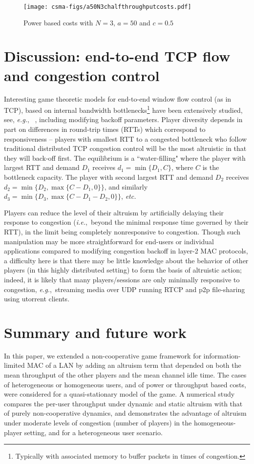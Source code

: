 \documentclass[12pt,onecolumn,draftcls]{IEEEtran}
\newcommand{\etc}{{\em etc.}~}
\newcommand{\ie}{{\em i.e.},~}
\newcommand{\eg}{{\em e.g.},~}
\begin{document}
\begin{figure}
\centering
\texttt{[image: csma-figs/a50N3chalfthroughputcosts.pdf]}
\caption{Power based costs with  $N=3$, $a=50$ and $c=0.5$}\label{fig:attraction}
\end{figure}

\section{Discussion: end-to-end TCP flow and congestion control}\label{tcp-sec}

Interesting game theoretic models for end-to-end window
flow control (as in TCP), based on internal bandwidth
bottlenecks\footnote{Typically with associated memory to buffer packets in
times of congestion.} have been extensively studied, see, \eg
\cite{Mo00,Shenker02}, including modifying backoff parameters.
Player diversity depends in part on differences in round-trip times (RTTs)
which correspond to responsiveness -- players with smallest RTT to a
congested bottleneck who follow traditional distributed TCP congestion
control will be the most altruistic  in that they will back-off first.
The equilibrium is a ``water-filling" where the player with largest RTT and
demand $D_1$ receives $d_1=\min\{D_1,C\}$, where $C$ is the bottleneck
capacity. The player with second largest RTT and demand $D_2$ receives
$d_2= \min\{D_2,\max\{C-D_1,0\}\}$, and similarly $d_3=
\min\{D_3,\max\{C-D_1-D_2,0\}\}$, \etc

Players can reduce the level of their  altruism by artificially delaying
their response to congestion (\ie beyond the minimal response time governed
by their RTT), in the limit being completely nonresponsive to congestion.
Though such manipulation may be more straightforward for end-users or
individual applications compared to modifying congestion backoff in layer-2
MAC protocols, a difficulty here is that there may be little knowledge
about the behavior of other players (in this highly distributed setting) to
form the basis of altruistic action; indeed, it is likely that many
players/sessions are only minimally responsive to congestion, \eg streaming
media over UDP running RTCP and p2p file-sharing using utorrent clients.


\section{Summary and  future work}\label{summary-future-sec}

In this paper, we extended a non-cooperative game framework for
information-limited MAC of a LAN by adding an altruism term that depended
on both the mean throughput of the other players and the mean channel 
idle time. The cases of heterogeneous or homogeneous users, and
of power or throughput based costs, were considered for a quasi-stationary
model of the game. A numerical study compares the per-user throughput
under dynamic and static altruism with that of purely non-cooperative
dynamics, and demonstrates the advantage of altruism under moderate levels
of congestion (number of players) in the homogeneous-player setting, and
for a heterogeneous user scenario.
\end{document}
